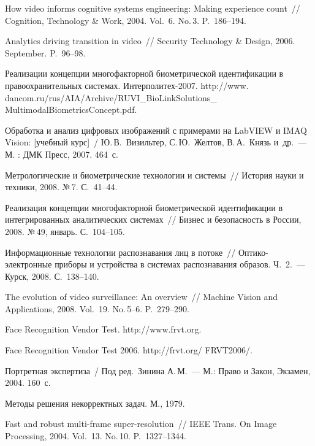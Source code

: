 \begin{multicols}{2}
{{\begin{thebibliography}{99}
How video informs cognitive systems engineering: Making experience count~//
Cognition, Technology \& Work, 2004. Vol.~6. No.\,3. P.~186--194.

Analytics driving transition in video~// Security Technology \& Design, 2006.
September. P.~96--98.

Реализации концепции многофак\-тор\-ной биометрической идентификации в
пра\-во\-ох\-ра\-ни\-тельных системах. Интерполитех-2007.
{\sf http://www. dancom.ru/rus/AIA/Archive/RUVI\_BioLinkSolutions\_ MultimodalBiometricsConcept.pdf}.

Обработка и анализ цифровых изображений с примерами на LabVIEW и IMAQ Vision: [учебный
курс]~/ Ю.\,В.~Визильтер, С.\,Ю.~Желтов, В.\,А.~Князь и~др.~--- М. : ДМК Пресс, 2007.  464~с.


Метрологические и биометрические технологии и
системы~// История науки и техники, 2008.  №\,7. С.~41--44.

Реализация концепции многофакторной биометрической 
идентификации в интегрированных аналитических системах~// Бизнес и безопасность в России, 2008.
№\,49, январь. С.~104--105.

Информационные технологии распознавания лиц в потоке~// 
Оптико-элек\-трон\-ные приборы и устройства в системах распознавания образов. Ч.~2.~--- Курск, 2008. 
С.~138--140.

The evolution of video surveillance: An overview~// 
Machine Vision and Applications, 2008. Vol.~19. No.\,5--6. P.~279--290.

Face Recognition Vendor Test. {\sf http://www.frvt.org}.

Face Recognition Vendor Test  2006. {\sf http://frvt.org/ FRVT2006/}.

Портретная экспертиза~/ Под ред.\ Зинина А.\,М.~---  М.: Право и Закон, Экзамен, 2004. 160~с.

Методы решения некорректных задач. М., 1979.

Fast and robust multi-frame super-resolution~// 
IEEE Trans. On Image Processing, 2004. Vol.~13. No.\,10. P.~1327--1344.


\end{thebibliography}}}
\end{multicols}
